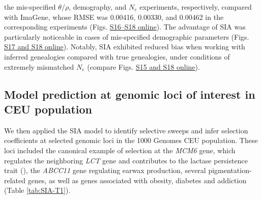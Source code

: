 the mis-specified $\theta/\rho$, demography, and $N_e$ experiments, respectively, compared with ImaGene, whose \ac{RMSE} was 0.00416, 0.00330, and 0.00462 in the corresponding experiments (Figs. \href{https://academic.oup.com/mbe/article/39/1/msab332/6433161?login=true#supplementary-data}{S16–S18 online}). The advantage of \ac{SIA} was particularly noticeable in cases of mis-specified demographic parameters (Figs. \href{https://academic.oup.com/mbe/article/39/1/msab332/6433161?login=true#supplementary-data}{S17 and S18 online}). Notably, \ac{SIA} exhibited reduced bias when working with inferred genealogies compared with true genealogies, under conditions of extremely mismatched $N_e$ (compare Figs. \href{https://academic.oup.com/mbe/article/39/1/msab332/6433161?login=true#supplementary-data}{S15 and S18 online}).

\subsection{Model prediction at genomic loci of interest in CEU population}
We then applied the \ac{SIA} model to identify selective sweeps and infer selection coefficients at selected genomic loci in the 1000 Genomes CEU population. These loci included the canonical example of selection at the \textit{MCM6} gene, which regulates the neighboring \textit{LCT} gene and contributes to the lactase persistence trait (\cite{bersaglieri_genetic_2004}), the \textit{ABCC11} gene regulating earwax production, several pigmentation-related genes, as well as genes associated with obesity, diabetes and addiction (Table \ref{tab:SIA-T1}).



